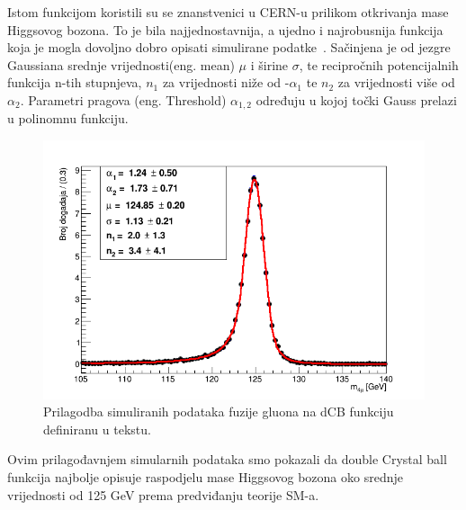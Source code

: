 \documentclass[12pt,a4paper,oneside]{article}
\begin{document}
\begin{linenumbers}
		
		Istom funkcijom koristili su se znanstvenici u CERN-u prilikom otkrivanja mase Higgsovog bozona. To je bila najjednostavnija, a ujedno i najrobusnija funkcija koja je mogla dovoljno dobro opisati simulirane podatke~\cite{atlas-rad}. Sačinjena je od jezgre Gaussiana srednje vrijednosti(eng. mean) $\mu$ i širine $\sigma$, te recipročnih potencijalnih funkcija n-tih stupnjeva, $n_{1}$ za vrijednosti niže od -$\alpha_{1}$ te $n_{2}$ za vrijednosti više od $\alpha_{2}$. Parametri pragova (eng. Threshold)  $\alpha_{1,2}$ određuju u kojoj točki Gauss prelazi u polinomnu funkciju.
		\begin{figure}[H]
			\centering
			\includegraphics[width=1.0\textwidth]{dCB-23-7-final-weighted.png}
			\caption[Prilagodba simuliranih podataka fuzije gluona na dCB funkciju definiranu u tekstu.]{\label{sl:dcbfit} Prilagodba simuliranih podataka fuzije gluona na dCB funkciju definiranu u tekstu.}
		\end{figure}
	
		Ovim prilagođavnjem simularnih podataka smo pokazali da double Crystal ball funkcija najbolje opisuje raspodjelu mase Higgsovog bozona oko srednje vrijednosti od 125 GeV prema predviđanju teorije SM-a.
	

\end{linenumbers}
\end{document}
